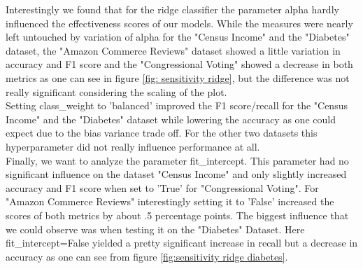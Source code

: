 \documentclass[a4paper,10pt]{article}
\begin{document}
Interestingly we found that for the ridge classifier the parameter \textsf{alpha} hardly influenced the effectiveness scores of our models. While the measures were nearly left untouched by variation of \textsf{alpha} for the "Census Income" and the "Diabetes" dataset, the "Amazon Commerce Reviews" dataset showed a little variation  in accuracy and F1 score and the "Congressional Voting" showed a decrease in both metrics as one can see in figure \ref{fig: sensitivity ridge}, but the difference was not really significant considering the scaling of the plot.\\
Setting \textsf{class\_weight} to 'balanced' improved the F1 score/recall for the "Census Income" and the "Diabetes" dataset while lowering the accuracy as one could expect due to the bias variance trade off. For the other two datasets this hyperparameter did not really influence performance at all.\\
Finally, we want to analyze the parameter \textsf{fit\_intercept}. This parameter had no significant influence on the dataset "Census Income" and only slightly increased accuracy and F1 score when set to 'True' for "Congressional Voting". For "Amazon Commerce Reviews" interestingly setting it to 'False' increased the scores of both metrics by about .5 percentage points. The biggest influence that we could observe was when testing it on the "Diabetes" Dataset. Here \textsf{fit\_intercept}=False yielded a pretty significant increase in recall but a decrease in accuracy as one can see from figure \ref{fig:sensitivity ridge diabetes}.
\end{document}
